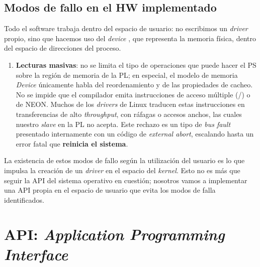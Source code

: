 \subsection{Modos de fallo en el HW implementado}
\label{S:sw-modos-fallo}

Todo el software trabaja dentro del espacio de usuario: no escribimos un \emph{driver}
propio, sino que hacemos uso del \emph{device} , que representa la
memoria física, dentro del espacio de direcciones del proceso.
\begin{enumerate}
  \item \textbf{Lecturas masivas}: no se limita el tipo de operaciones que puede
    hacer el PS sobre la región de memoria de la PL; en especial, el modelo de
    memoria \emph{Device} únicamente habla del reordenamiento y de las propiedades de
    cacheo. No se impide que el compilador emita instrucciones de acceso
    múltiple (/) o de NEON. Muchos de los \emph{drivers} de
    Linux traducen estas instrucciones en transferencias de alto \emph{throughput}, con
    ráfagas o accesos anchos, las cuales nuestro \emph{slave} en la PL no acepta. Este
    rechazo es un tipo de \emph{bus fault} presentado internamente con un código de
    \emph{external abort}, escalando hasta un error fatal que \textbf{reinicia
    el sistema}.
\end{enumerate}

La existencia de estos modos de fallo según la utilización del usuario es lo que
impulsa la creación de un \emph{driver} en el espacio del \emph{kernel}. Esto no es más que
seguir la API del sistema operativo en cuestión; nosotros vamos a implementar
una API propia en el espacio de usuario que evita los modos de falla
identificados.

\section{API: \emph{Application Programming Interface}}
\label{S:sw-api}

